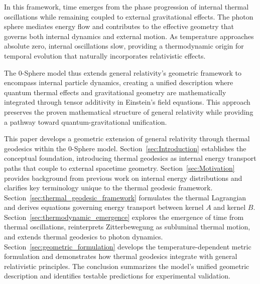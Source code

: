 \documentclass[%
 reprint,
 amsmath,amssymb,
 aps,
]{revtex4-1}
\numberwithin{equation}{section}%
\begin{document}
In this framework, time emerges from the phase progression of internal thermal oscillations while remaining coupled to external gravitational effects. The photon sphere mediates energy flow and contributes to the effective geometry that governs both internal dynamics and external motion. As temperature approaches absolute zero, internal oscillations slow, providing a thermodynamic origin for temporal evolution that naturally incorporates relativistic effects.

The 0-Sphere model thus extends general relativity's geometric framework to encompass internal particle dynamics, creating a unified description where quantum thermal effects and gravitational geometry are mathematically integrated through tensor additivity in Einstein's field equations. This approach preserves the proven mathematical structure of general relativity while providing a pathway toward quantum-gravitational unification.

This paper develops a geometric extension of general relativity through thermal geodesics within the 0-Sphere model. Section~\ref{sec:Introduction} establishes the conceptual foundation, introducing thermal geodesics as internal energy transport paths that couple to external spacetime geometry. Section~\ref{sec:Motivation} provides background from previous work on internal energy distributions and clarifies key terminology unique to the thermal geodesic framework. Section~\ref{sec:thermal_geodesic_framework} formulates the thermal Lagrangian and derives equations governing energy transport between kernel $A$ and kernel $B$. Section~\ref{sec:thermodynamic_emergence} explores the emergence of time from thermal oscillations, reinterprets Zitterbewegung as subluminal thermal motion, and extends thermal geodesics to photon dynamics. Section~\ref{sec:geometric_formulation} develops the temperature-dependent metric formulation and demonstrates how thermal geodesics integrate with general relativistic principles. The conclusion summarizes the model's unified geometric description and identifies testable predictions for experimental validation.
\end{document}
